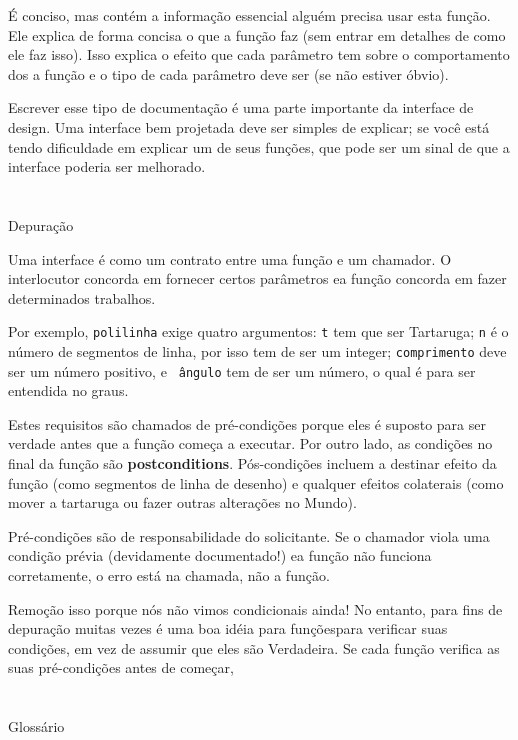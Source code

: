 \documentclass[10pt]{book}
\begin{document}
\begin{exercise}
É conciso, mas contém a informação essencial
alguém precisa usar esta função. Ele explica de forma concisa o que
a função faz (sem entrar em detalhes de como ele faz
isso). Isso explica o efeito que cada parâmetro tem sobre o comportamento dos
a função e o tipo de cada parâmetro deve ser (se não estiver
óbvio).

Escrever esse tipo de documentação é uma parte importante da interface de
design. Uma interface bem projetada deve ser simples de explicar;
se você está tendo dificuldade em explicar um de seus funções,
que pode ser um sinal de que a interface poderia ser melhorado.


\section{} Depuração

Uma interface é como um contrato entre uma função e um chamador.
O interlocutor concorda em fornecer certos parâmetros ea função
concorda em fazer determinados trabalhos.

Por exemplo, {\tt polilinha} exige quatro argumentos: {\tt t} tem que ser
Tartaruga; {\tt n} é o número de segmentos de linha, por isso tem de ser um
integer; {\tt comprimento} deve ser um número positivo, e {\tt
  ângulo} tem de ser um número, o qual é para ser entendida no graus.

Estes requisitos são chamados de pré-condições {\bf} porque eles
é suposto para ser verdade antes que a função começa a executar.
Por outro lado, as condições no final da função são
{\bf postconditions}. Pós-condições incluem a destinar
efeito da função (como segmentos de linha de desenho) e qualquer
efeitos colaterais (como mover a tartaruga ou fazer outras alterações
no Mundo).

Pré-condições são de responsabilidade do solicitante. Se o chamador
viola uma condição prévia (devidamente documentado!) ea função
não funciona corretamente, o erro está na chamada, não a função.

Remoção isso porque nós não vimos condicionais ainda!
No entanto, para fins de depuração muitas vezes é uma boa idéia para
funçõespara verificar suas condições, em vez de assumir que eles são
Verdadeira. Se cada função verifica as suas pré-condições antes de começar,


\section{} Glossário


\end{exercise}
\end{document}
